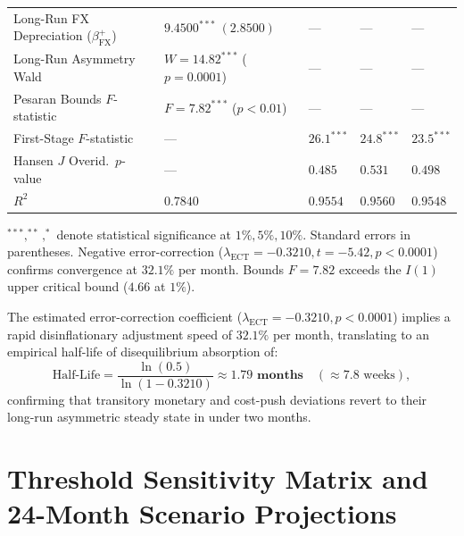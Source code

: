 \documentclass[review,12pt]{elsarticle}
\begin{document}
\begin{table}[H]
\begin{threeparttable}
\begin{tabularx}{\textwidth}{>{\raggedright\arraybackslash}p{3.6cm} YYYY}
Long-Run FX Depreciation ($\beta_{\text{FX}}^+$) & $9.4500^{***} \; (2.8500)$ & --- & --- & --- \\
Long-Run Asymmetry Wald & $W = 14.82^{***}$ ($p=0.0001$) & --- & --- & --- \\
Pesaran Bounds $F$-statistic & $F = 7.82^{***}$ ($p<0.01$) & --- & --- & --- \\
First-Stage $F$-statistic & --- & $26.1^{***}$ & $24.8^{***}$ & $23.5^{***}$ \\
Hansen $J$ Overid.\ $p$-value & --- & $0.485$ & $0.531$ & $0.498$ \\
$R^2$ & $0.7840$ & $0.9554$ & $0.9560$ & $0.9548$ \\
\bottomrule
\end{tabularx}
\begin{tablenotes}
\footnotesize
\item $^{***},^{**},^{*}$ denote statistical significance at $1\%, 5\%, 10\%$. Standard errors in parentheses. Negative error-correction ($\lambda_{\text{ECT}} = -0.3210, t = -5.42, p < 0.0001$) confirms convergence at $32.1\%$ per month. Bounds $F=7.82$ exceeds the \citet{pesaran2001} $I(1)$ upper critical bound ($4.66$ at $1\%$).
\end{tablenotes}
\end{threeparttable}
\end{table}

The estimated error-correction coefficient ($\lambda_{\text{ECT}} = -0.3210, p < 0.0001$) implies a rapid disinflationary adjustment speed of $32.1\%$ per month, translating to an empirical half-life of disequilibrium absorption of:
\begin{equation}
\text{Half-Life} = \frac{\ln(0.5)}{\ln(1 - 0.3210)} \approx \mathbf{1.79 \text{ months}} \quad (\approx 7.8 \text{ weeks}),
\label{eq:half_life}
\end{equation}
confirming that transitory monetary and cost-push deviations revert to their long-run asymmetric steady state in under two months.

\clearpage
\section{Threshold Sensitivity Matrix and 24-Month Scenario Projections}
\label{app:ai_forecast}
\end{document}

